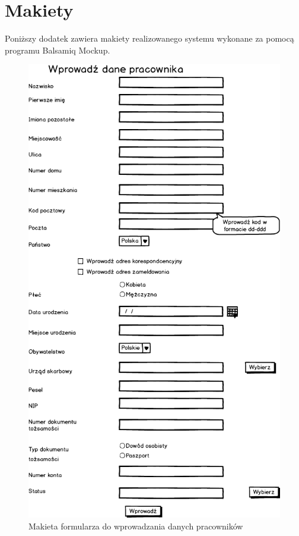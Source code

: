 \chapter{Makiety}
\label{makiety}
Poniższy dodatek zawiera makiety realizowanego systemu wykonane za pomocą programu Balsamiq Mockup.


\begin{figure}[tdh]
    \begin{center}
	\includegraphics[scale=.6 ]{img/mockup.png}
	\caption{Makieta formularza do wprowadzania danych pracowników}
	\label{makieta}
    \end{center}
\end{figure}

